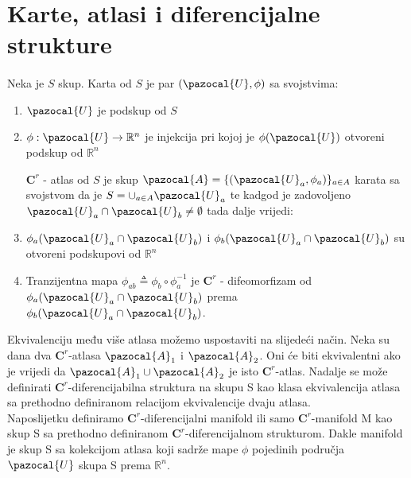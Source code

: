 \documentclass[times, utf8, diplomski]{fer}
\newcommand{\Ua}{\pazocal{U}}
\newcommand{\Aa}{\pazocal{A}}
\begin{document}
\section{Karte, atlasi i diferencijalne strukture}
	\paragraph{} Neka je $S$ skup. Karta od $S$ je par $(\Ua, \phi)$ sa svojstvima:
	\begin{enumerate}
		\item $\Ua$ je podskup od $S$
		\item $\phi: \Ua \rightarrow \mathbb{R}^n$ je injekcija pri kojoj je $\phi(\Ua)$ otvoreni podskup od $\mathbb{R}^n$
		
		$\boldsymbol{C}^r$ - atlas od $S$ je skup $\Aa = \{ (\Ua_a, \phi_a) \}_{a\in A}$ karata sa svojstvom da je $S = \cup_{a\in A}\Ua_a$ te kadgod je zadovoljeno $\Ua_a \cap \Ua_b \neq \emptyset$ tada dalje vrijedi:
		
		\item $\phi_a(\Ua_a \cap \Ua_b)$ i $\phi_b(\Ua_a\cap \Ua_b)$ su otvoreni podskupovi od $\mathbb{R}^n$
		\item Tranzijentna mapa $\phi_{ab} \triangleq \phi_b \circ \phi_a^{-1}$ je $\boldsymbol{C}^r$ - difeomorfizam od $\phi_a(\Ua_a \cap \Ua_b)$ prema $\phi_b(\Ua_a\cap \Ua_b)$.
	\end{enumerate}
	
	Ekvivalenciju među više atlasa možemo uspostaviti na slijedeći način. Neka su dana dva $\boldsymbol{C}^r$-atlasa $\Aa_1$ i $\Aa_2$. Oni će biti ekvivalentni ako je vrijedi da $\Aa_1 \cup \Aa_2$ je isto $\boldsymbol{C}^r$-atlas. Nadalje se može definirati $\boldsymbol{C}^r$-diferencijabilna struktura na skupu S kao klasa ekvivalencija atlasa sa prethodno definiranom relacijom ekvivalencije dvaju atlasa. \\
	Naposlijetku definiramo $\boldsymbol{C}^r$-diferencijalni manifold ili samo $\boldsymbol{C}^r$-manifold M kao skup S sa prethodno definiranom $\boldsymbol{C}^r$-diferencijalnom strukturom. Dakle manifold je skup S sa kolekcijom atlasa koji sadrže mape $\phi$ pojedinih područja $\Ua$ skupa S prema $\mathbb{R}^n$.
	
\newpage
\clearpage
	
\end{document}
